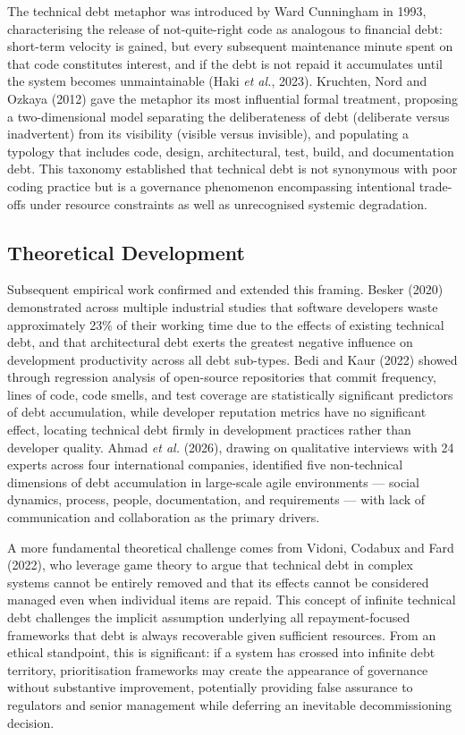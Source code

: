 \documentclass[
  british,
  12pt,
  a4paper,
]{report}
\begin{document}
The technical debt metaphor was introduced by Ward Cunningham in 1993,
characterising the release of not-quite-right code as analogous to
financial debt: short-term velocity is gained, but every subsequent
maintenance minute spent on that code constitutes interest, and if the
debt is not repaid it accumulates until the system becomes
unmaintainable (Haki \emph{et al.}, 2023). Kruchten, Nord and Ozkaya
(2012) gave the metaphor its most influential formal treatment,
proposing a two-dimensional model separating the deliberateness of debt
(deliberate versus inadvertent) from its visibility (visible versus
invisible), and populating a typology that includes code, design,
architectural, test, build, and documentation debt. This taxonomy
established that technical debt is not synonymous with poor coding
practice but is a governance phenomenon encompassing intentional
trade-offs under resource constraints as well as unrecognised systemic
degradation.

\subsection{Theoretical Development}\label{theoretical-development}

Subsequent empirical work confirmed and extended this framing. Besker
(2020) demonstrated across multiple industrial studies that software
developers waste approximately 23\% of their working time due to the
effects of existing technical debt, and that architectural debt exerts
the greatest negative influence on development productivity across all
debt sub-types. Bedi and Kaur (2022) showed through regression analysis
of open-source repositories that commit frequency, lines of code, code
smells, and test coverage are statistically significant predictors of
debt accumulation, while developer reputation metrics have no
significant effect, locating technical debt firmly in development
practices rather than developer quality. Ahmad \emph{et al.} (2026),
drawing on qualitative interviews with 24 experts across four
international companies, identified five non-technical dimensions of
debt accumulation in large-scale agile environments --- social dynamics,
process, people, documentation, and requirements --- with lack of
communication and collaboration as the primary drivers.

A more fundamental theoretical challenge comes from Vidoni, Codabux and
Fard (2022), who leverage game theory to argue that technical debt in
complex systems cannot be entirely removed and that its effects cannot
be considered managed even when individual items are repaid. This
concept of infinite technical debt challenges the implicit assumption
underlying all repayment-focused frameworks that debt is always
recoverable given sufficient resources. From an ethical standpoint, this
is significant: if a system has crossed into infinite debt territory,
prioritisation frameworks may create the appearance of governance
without substantive improvement, potentially providing false assurance
to regulators and senior management while deferring an inevitable
decommissioning decision.
\end{document}
